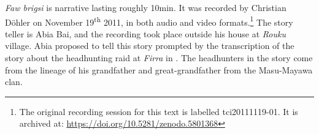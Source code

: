 \textit{Faw brigsi} is narrative lasting roughly 10min. It was recorded by Christian Döhler on November 19\textsuperscript{th} 2011, in both audio and video formats.\footnote{The original recording session for this text is labelled tci20111119-01. It is archived at: \href{https://doi.org/10.5281/zenodo.5801368}{https://doi.org/10.5281/zenodo.5801368}} The story teller is Abia Bai, and the recording took place outside his house at \textit{Rouku} village. Abia proposed to tell this story prompted by the transcription of the story about the headhunting raid at \textit{Firra} in . The headhunters in the story come from the lineage of his grandfather and great-grandfather from the Masu-Mayawa clan.